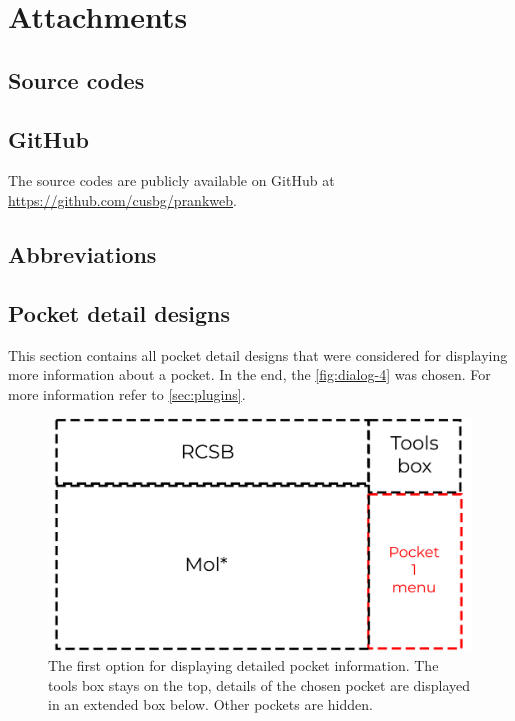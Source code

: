 \chapter{Attachments}

\section{Source codes}

\section{GitHub}
\label{sec:github}

The source codes are publicly available on GitHub at \url{https://github.com/cusbg/prankweb}.

\section{Abbreviations}
\label{sec:abbreviations}


\section{Pocket detail designs}
\label{sec:pocket_detail_designs}

This section contains all pocket detail designs that were considered for displaying more information about a pocket. In the end, the \cref{fig:dialog-4} was chosen. For more information refer to \cref{sec:plugins}.

\begin{figure}[htb]
    \centering
    \includegraphics[width=\linewidth]{img/dialog_1-svg.pdf}
    \caption{The first option for displaying detailed pocket information. The tools box stays on the top, details of the chosen pocket are displayed in an extended box below. Other pockets are hidden.}
    \label{fig:dialog-1}
\end{figure}

